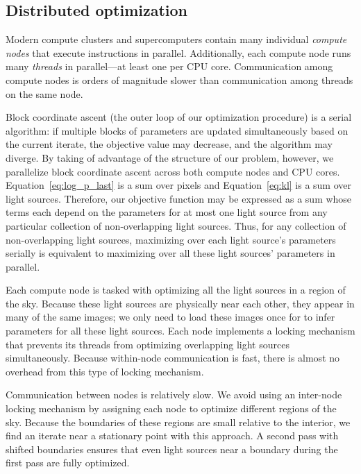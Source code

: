 \subsection{Distributed optimization}
\label{distributed}

Modern compute clusters and supercomputers contain many individual \textit{compute nodes} that execute instructions in parallel. Additionally, each compute node runs many \textit{threads} in parallel---at least one per CPU core.
Communication among compute nodes is orders of magnitude slower than communication among threads on the same node.

Block coordinate ascent (the outer loop of our optimization procedure) is a serial algorithm: if multiple blocks of parameters are updated simultaneously based on the current iterate, the objective value may decrease, and the algorithm may diverge. By taking of advantage of the structure of our problem, however, we parallelize block coordinate ascent across both compute nodes and CPU cores.
Equation~\ref{eq:log_p_last} is a sum over pixels and Equation~\ref{eq:kl} is a sum over light sources.
Therefore, our objective function may be expressed as a sum whose terms each depend on the parameters for at most one light source from any particular collection of non-overlapping light sources.
Thus, for any collection of non-overlapping light sources, maximizing over each light source's parameters serially is equivalent to maximizing over all these light sources' parameters in parallel.

Each compute node is tasked with optimizing all the light sources in a region of the sky.
Because these light sources are physically near each other, they appear in many of the same images; we only need to load these images once for to infer parameters for all these light sources.
Each node implements a locking mechanism that prevents its threads from optimizing overlapping light sources simultaneously. Because within-node communication is fast, there is almost no overhead from this type of locking mechanism.

Communication between nodes is relatively slow. We avoid using an inter-node locking mechanism by assigning each node to optimize different regions of the sky. Because the boundaries of these regions are small relative to the interior,
we find an iterate near a stationary point with this approach. A second pass with shifted boundaries ensures that even light sources near a boundary during the first pass are fully optimized.
